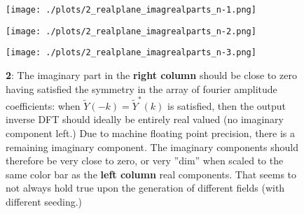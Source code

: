 \begin{figure}[h!]
  \centering
  \texttt{[image: ./plots/2\_realplane\_imagrealparts\_n-1.png]}
  \label{fig:imagrealparts}
\end{figure}

\begin{figure}[h!]
  \centering
  \texttt{[image: ./plots/2\_realplane\_imagrealparts\_n-2.png]}
  \label{fig:imagrealparts}
\end{figure}

\begin{figure}[h!]
  \centering
  \texttt{[image: ./plots/2\_realplane\_imagrealparts\_n-3.png]}
  \caption{\textbf{2}: The imaginary part in the \textbf{right column} should be close to zero having satisfied the symmetry in the array of fourier amplitude coefficients: when $\widetilde{Y}(-k)=\widetilde{Y}^*(k)$ is satisfied, then the output inverse DFT should ideally be entirely real valued (no imaginary component left.) Due to machine floating point precision, there is a remaining imaginary component. The imaginary components should therefore be very close to zero, or very ''dim'' when scaled to the same color bar as the \textbf{left column} real components. That seems to not always hold true upon the generation of different fields (with different seeding.)}
  \label{fig:imagrealparts}
\end{figure}


